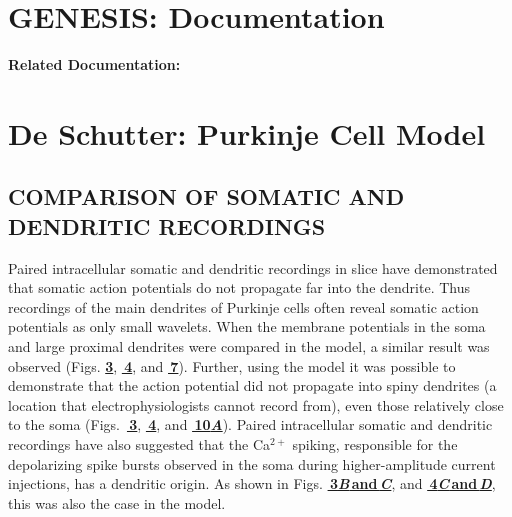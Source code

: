 \documentclass[12pt]{article}
\begin{document}
\section*{GENESIS: Documentation}

{\bf Related Documentation:}

\section*{De Schutter: Purkinje Cell Model}

\subsection*{COMPARISON OF SOMATIC AND DENDRITIC RECORDINGS}

Paired intracellular somatic and dendritic recordings in
slice have demonstrated that somatic action potentials do
not propagate far into the dendrite. Thus recordings of the
main dendrites of Purkinje cells often reveal somatic action
potentials as only small wavelets. When the membrane potentials
in the soma and large proximal dendrites were compared
in the model, a similar result was observed (Figs. \href{../pub-purkinje-deschutter1-fig-3/pub-purkinje-deschutter1-fig-3.tex}{\bf 3},  \href{../pub-purkinje-deschutter1-fig-4/pub-purkinje-deschutter1-fig-4.tex}{\bf\,4},
and \href{../pub-purkinje-deschutter1-fig-7/pub-purkinje-deschutter1-fig-7.tex}{\bf\,7}). Further, using the model it was possible to demonstrate
that the action potential did not propagate into spiny
dendrites (a location that electrophysiologists cannot record
from), even those relatively close to the soma (Figs. \,\href{../pub-purkinje-deschutter1-fig-3/pub-purkinje-deschutter1-fig-3.tex}{\bf\,3},
 \href{../pub-purkinje-deschutter1-fig-4/pub-purkinje-deschutter1-fig-4.tex}{\bf\,4}, and  \href{../pub-purkinje-deschutter1-fig-10/pub-purkinje-deschutter1-fig-10.tex}{\bf\,10{\it A}}).
Paired intracellular somatic and dendritic recordings
have also suggested that the Ca$^{2+}$ spiking, responsible for
the depolarizing spike bursts observed in the soma during
higher-amplitude current injections, has a dendritic origin.
As shown in Figs.  \href{../pub-purkinje-deschutter1-fig-3/pub-purkinje-deschutter1-fig-3.tex}{\bf\,3{\it B}\,and\,{\it C}}, and \href{../pub-purkinje-deschutter1-fig-4/pub-purkinje-deschutter1-fig-4.tex}{\bf\,4{\it C}\,and\,{\it D}}, this was also
the case in the model.



\end{document}
